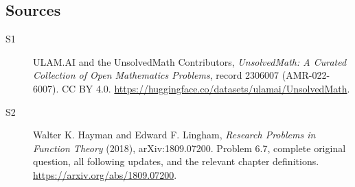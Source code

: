\documentclass[11pt]{book}
\begin{document}
\subsection{Sources}
\begin{description}
\item[\hypertarget{source:2306007:1}{S1}] ULAM.AI and the UnsolvedMath Contributors, \emph{UnsolvedMath: A Curated Collection of Open Mathematics Problems}, record 2306007 (AMR-022-6007). CC BY 4.0. \url{https://huggingface.co/datasets/ulamai/UnsolvedMath}.
\item[\hypertarget{source:2306007:2}{S2}] Walter K. Hayman and Edward F. Lingham, \emph{Research Problems in Function Theory} (2018), arXiv:1809.07200. Problem 6.7, complete original question, all following updates, and the relevant chapter definitions. \url{https://arxiv.org/abs/1809.07200}.
\end{description}
\label{end:2306007}
\end{document}
